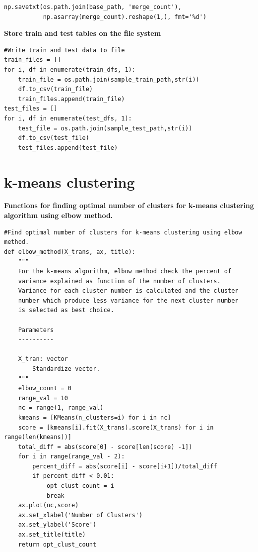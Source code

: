 \documentclass{article}
\begin{document}
\begin{verbatim}
np.savetxt(os.path.join(base_path, 'merge_count'),
           np.asarray(merge_count).reshape(1,), fmt='%d')
\end{verbatim}
\textbf{Store train and test tables on the file system}
\begin{verbatim}
#Write train and test data to file
train_files = []
for i, df in enumerate(train_dfs, 1):
    train_file = os.path.join(sample_train_path,str(i))
    df.to_csv(train_file)
    train_files.append(train_file)
test_files = []
for i, df in enumerate(test_dfs, 1):
    test_file = os.path.join(sample_test_path,str(i))
    df.to_csv(test_file)
    test_files.append(test_file)
\end{verbatim}
\pagebreak
\section{k-means clustering}
\textbf{\large{Functions for finding optimal number of clusters for k-means clustering algorithm using elbow method.}}
\begin{verbatim}
#Find optimal number of clusters for k-means clustering using elbow method.
def elbow_method(X_trans, ax, title):
    """
    For the k-means algorithm, elbow method check the percent of
    variance explained as function of the number of clusters.
    Variance for each cluster number is calculated and the cluster
    number which produce less variance for the next cluster number
    is selected as best choice.

    Parameters
    ----------

    X_tran: vector
        Standardize vector.
    """
    elbow_count = 0
    range_val = 10
    nc = range(1, range_val)
    kmeans = [KMeans(n_clusters=i) for i in nc]
    score = [kmeans[i].fit(X_trans).score(X_trans) for i in range(len(kmeans))]
    total_diff = abs(score[0] - score[len(score) -1])
    for i in range(range_val - 2):
        percent_diff = abs(score[i] - score[i+1])/total_diff
        if percent_diff < 0.01:
            opt_clust_count = i
            break
    ax.plot(nc,score)
    ax.set_xlabel('Number of Clusters')
    ax.set_ylabel('Score')
    ax.set_title(title)
    return opt_clust_count
\end{verbatim}
\end{document}
